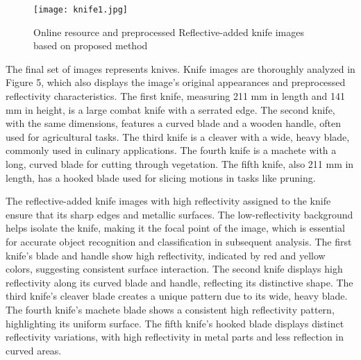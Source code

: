 \documentclass[journal,article,submit,pdftex,moreauthors]{Definitions/mdpi}
\begin{document}




\begin{figure}[h]
  \centering
  \texttt{[image: knife1.jpg]}
  \caption{Online resource and preprocessed Reflective-added knife images based on proposed method}
  \label{Figure:}
\end{figure}

The final set of images represents knives. Knife images are thoroughly analyzed in Figure 5, which also displays the image's original appearances and preprocessed reflectivity characteristics. The first knife, measuring 211 mm in length and 141 mm in height, is a large combat knife with a serrated edge. The second knife, with the same dimensions, features a curved blade and a wooden handle, often used for agricultural tasks. The third knife is a cleaver with a wide, heavy blade, commonly used in culinary applications. The fourth knife is a machete with a long, curved blade for cutting through vegetation. The fifth knife, also 211 mm in length, has a hooked blade used for slicing motions in tasks like pruning.

The reflective-added knife images with high reflectivity assigned to the knife ensure that its sharp edges and metallic surfaces. The low-reflectivity background helps isolate the knife, making it the focal point of the image, which is essential for accurate object recognition and classification in subsequent analysis. The first knife's blade and handle show high reflectivity, indicated by red and yellow colors, suggesting consistent surface interaction. The second knife displays high reflectivity along its curved blade and handle, reflecting its distinctive shape. The third knife's cleaver blade creates a unique pattern due to its wide, heavy blade. The fourth knife's machete blade shows a consistent high reflectivity pattern, highlighting its uniform surface. The fifth knife’s hooked blade displays distinct reflectivity variations, with high reflectivity in metal parts and less reflection in curved areas.
\end{document}
